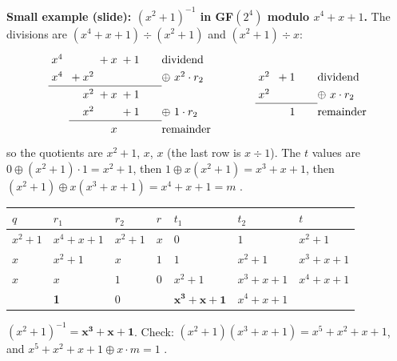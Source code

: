 \textbf{Small example (slide): $(x^2 + 1)^{-1}$ in GF$(2^4)$ modulo $x^4 + x + 1$.} The divisions are
$(x^4 + x + 1) \div (x^2 + 1)$ and $(x^2 + 1) \div x$:
\[
\renewcommand{\arraystretch}{1.3}\begin{array}{@{}*{5}{@{\;}r}@{\qquad}l@{}}
x^{4} &  &  & {}+x & {}+1 & \text{dividend}\\
x^{4} &  & {}+x^{2} &  &  & \oplus\ x^{2}\cdot r_2\\
\cline{1-5}
 &  & x^{2} & {}+x & {}+1 & \\
 &  & x^{2} &  & {}+1 & \oplus\ 1\cdot r_2\\
\cline{3-5}
 &  &  & x &   & \text{remainder}\\
\end{array}
\qquad\qquad
\renewcommand{\arraystretch}{1.3}\begin{array}{@{}*{3}{@{\;}r}@{\qquad}l@{}}
x^{2} &  & {}+1 & \text{dividend}\\
x^{2} &  &  & \oplus\ x\cdot r_2\\
\cline{1-3}
 &  & 1  & \text{remainder}\\
\end{array}
\]
so the quotients are $x^2 + 1$, $x$, $x$ (the last row is $x \div 1$). The $t$ values are $0 \oplus (x^2 + 1) \cdot 1 = x^2 + 1$, then $1 \oplus x(x^2 + 1) = x^3 + x + 1$, then $(x^2 + 1) \oplus x(x^3 + x + 1) = x^4 + x + 1 = m$ \checkmark.
\begin{center}\small
\begin{tabular}{@{}lllllll@{}}
\toprule
$q$ & $r_1$ & $r_2$ & $r$ & $t_1$ & $t_2$ & $t$\\
\midrule
$x^2{+}1$ & $x^4{+}x{+}1$ & $x^2{+}1$ & $x$ & $0$ & $1$ & $x^2{+}1$\\
$x$ & $x^2{+}1$ & $x$ & $1$ & $1$ & $x^2{+}1$ & $x^3{+}x{+}1$\\
$x$ & $x$ & $1$ & $0$ & $x^2{+}1$ & $x^3{+}x{+}1$ & $x^4{+}x{+}1$\\
 & \textbf{1} & 0 & & $\mathbf{x^3{+}x{+}1}$ & $x^4{+}x{+}1$ & \\
\bottomrule
\end{tabular}
\end{center}
$(x^2 + 1)^{-1} = \mathbf{x^3 + x + 1}$. Check: $(x^2 + 1)(x^3 + x + 1) = x^5 + x^2 + x + 1$, and $x^5 + x^2 + x + 1 \oplus x \cdot m = 1$ \checkmark.

